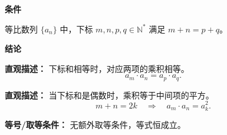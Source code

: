 \begin{statementbox}
\textbf{\textcolor{CStatement}{条件}}
\begin{description}[style=nextline, leftmargin=2.8em, labelsep=0.5em, itemsep=0.35em]
    \item[\textbf{\textcolor{CStatement}{条件1（下标和相等）：}}] 等比数列 $\{a_n\}$ 中，下标 $m,n,p,q\in\mathbb{N}^*$ 满足 $m+n=p+q$。
\end{description}

\textbf{\textcolor{CStatement}{结论}}
\begin{description}[style=nextline, leftmargin=2.8em, labelsep=0.5em, itemsep=0.45em]
    \item[\textbf{\textcolor{CStatement}{结论一（两项乘积相等）：}}]
    \textbf{\textcolor{CStatement}{直观描述：}} 下标和相等时，对应两项的乘积相等。
    \[
    a_m\cdot a_n = a_p\cdot a_q.
    \]

    \item[\textbf{\textcolor{CStatement}{推广结论（等比中项性质）：}}]
    \textbf{\textcolor{CStatement}{直观描述：}} 当下标和是偶数时，乘积等于中间项的平方。
    \[
    m+n=2k \quad\Rightarrow\quad a_m\cdot a_n = a_k^2.
    \]
\end{description}

\textbf{\textcolor{CStatement}{等号/取等条件：}} 无额外取等条件，等式恒成立。
\end{statementbox}
